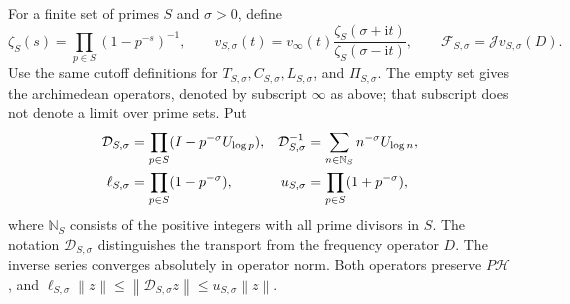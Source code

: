 \documentclass[11pt]{article}
\numberwithin{equation}{section}
\theoremstyle{definition}
\theoremstyle{remark}
\newcommand{\HH}{\mathcal H}
\newcommand{\ii}{\mathrm i}
\newcommand{\Id}{I}
\newcommand{\J}{\mathcal J}
\newcommand{\Fcal}{\mathcal F}
\newcommand{\norm}[1]{\left\lVert #1\right\rVert}
\begin{document}
For a finite set of primes \(S\) and \(\sigma>0\), define
\[
\zeta_S(s)=\prod_{p\in S}(1-p^{-s})^{-1},\qquad
v_{S,\sigma}(t)=v_\infty(t)
\frac{\zeta_S(\sigma+\ii t)}{\zeta_S(\sigma-\ii t)},\qquad
\Fcal_{S,\sigma}=\J v_{S,\sigma}(D).
\]
Use the same cutoff definitions for \(T_{S,\sigma},C_{S,\sigma},
L_{S,\sigma}\), and \(\Pi_{S,\sigma}\). The empty set gives the
archimedean operators, denoted by subscript \(\infty\) as above;
that subscript does not denote a limit over prime sets. Put
\begin{align}
\mathcal D_{S,\sigma}&=\prod_{p\in S}(\Id-p^{-\sigma}U_{\log p}),&
\mathcal D_{S,\sigma}^{-1}
&=\sum_{n\in\mathbb N_S}n^{-\sigma}U_{\log n},
\label{eq:finite-transport}\\
\ell_{S,\sigma}&=\prod_{p\in S}(1-p^{-\sigma}),&
u_{S,\sigma}&=\prod_{p\in S}(1+p^{-\sigma}),\notag
\end{align}
where \(\mathbb N_S\) consists of the positive integers with all prime
divisors in \(S\). The notation \(\mathcal D_{S,\sigma}\)
distinguishes the transport from the frequency operator \(D\).
The inverse series converges absolutely in operator norm. Both operators preserve \(P\HH\), and
\(\ell_{S,\sigma}\norm z\le\norm{\mathcal D_{S,\sigma}z}
\le u_{S,\sigma}\norm z\).
\end{document}

